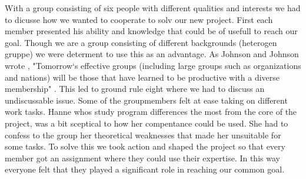 With a group consisting of six people with different qualities and interests we had to dicusse how we wanted to cooperate to solv our new project. First each member presented his ability and knowledge that could be of usefull to reach our goal. Though we are a group consisting of different backgrounds (heterogen gruppe) we were determent to use this as an advantage. As Johnson and Johnson wrote \cite{ValuingDiversity}, "Tomorrow`s effective groups (including large groups such as organizations and nations) will be those that have learned to be productive with a diverse membership" . This led to ground rule eight \cite{EffectiveGroups} where we had to discuss an undiscussable issue. Some of the groupmembers felt at ease taking on different work tasks. Hanne whos study program differences the most from the core of the project, was a bit sceptical to how her compentance could be used. She had to confess to the group her theoretical weaknesses that made her unsuitable for some tasks. To solve this we took action and shaped the project so that every member got an assignment where they could use their expertise. In this way everyone felt that they played a significant role in reaching our common goal. 
 

  